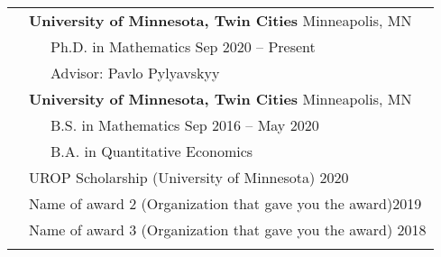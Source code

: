 \documentclass[letterpaper, 11pt]{article}
\newcommand{\mycolor}[0]{\color{RoyalBlue}}
\begin{document}
\begin{longtable}{p{1.5in}p{4.9in}}
\mycolor{Education} 
& \textbf{University of Minnesota, Twin Cities} \hfill Minneapolis, MN \\ 
&\ \ \ Ph.D. in Mathematics \hfill Sep 2020 -- Present \\
&\ \ \ Advisor: Pavlo Pylyavskyy\\ 
& \textbf{University of Minnesota, Twin Cities} \hfill Minneapolis, MN \\ 
&\ \ \ B.S. in Mathematics \hfill Sep 2016 -- May 2020\\
&\ \ \ B.A. in Quantitative Economics %
\\

\begin{comment}
{\mycolor{Awards and}} 
& UROP Scholarship (University of Minnesota) \hfill 2020\\
{\mycolor{scholarships}} 
& Name of award 2 (Organization that gave you the award)\hfill 2019 \\
& Name of award 3 (Organization that gave you the award) \hfill 2018 \\
\end{comment}
& \\




\end{longtable}
\end{document}

